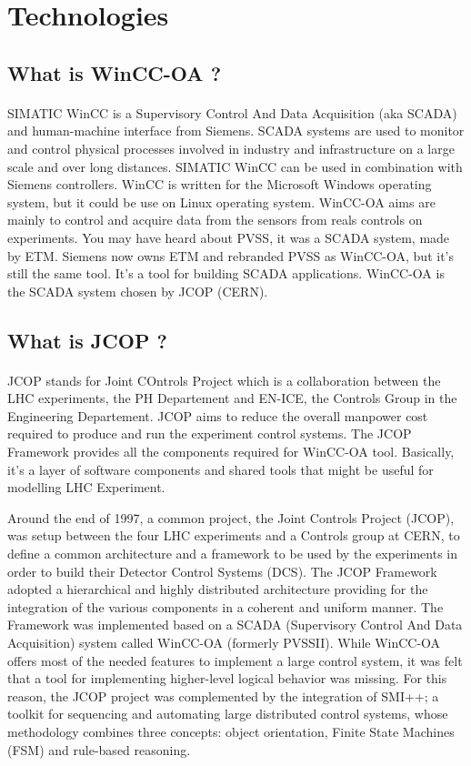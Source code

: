 \documentclass[a4paper, 12pt]{article}
\begin{document}
\section{Technologies}
\subsection{What is WinCC-OA ?}
\paragraph{}
SIMATIC WinCC is a Supervisory Control And Data Acquisition (aka SCADA) and human-machine interface from Siemens. 
SCADA systems are used to monitor and control physical processes involved in industry and infrastructure on a large scale and over long distances. 
SIMATIC WinCC can be used in combination with Siemens controllers. 
WinCC is written for the Microsoft Windows operating system, but it could be use on Linux operating system. 
WinCC-OA aims are mainly to control and acquire data from the sensors from reals controls on experiments.
You may have heard about PVSS, it was a SCADA system, made by ETM. 
Siemens now owns ETM and rebranded PVSS as WinCC-OA, but it's still the same tool. 
It's a tool for building SCADA applications. WinCC-OA is the SCADA system chosen by JCOP (CERN).

\subsection{What is JCOP ?}
\paragraph{}
JCOP stands for Joint COntrols Project which is a collaboration between the LHC experiments, the PH Departement and EN-ICE, the Controls Group in the Engineering Departement. 
JCOP aims to reduce the overall manpower cost required to produce and run the experiment control systems.
The JCOP Framework provides all the components required for WinCC-OA tool. 
Basically, it's a layer of software components and shared tools that might be useful for modelling LHC Experiment.

Around the end of 1997, a common project, the Joint Controls Project (JCOP), was setup between the four LHC experiments and a Controls group at CERN, to define a common architecture and a framework to be used by the experiments in order to build their Detector Control Systems (DCS).
The JCOP Framework adopted a hierarchical and highly distributed architecture providing for the integration of the various components in a coherent and uniform manner. 
The Framework was implemented based on a SCADA (Supervisory Control And Data Acquisition) system called WinCC-OA (formerly PVSSII). 
While WinCC-OA offers most of the needed features to implement a large control system, it was felt that a tool for implementing higher-level logical behavior was missing.
For this reason, the JCOP project was complemented by the integration of SMI++; a toolkit for sequencing and automating large distributed control systems, whose methodology combines three concepts: object orientation, Finite State Machines (FSM) and rule-based reasoning.
\end{document}
